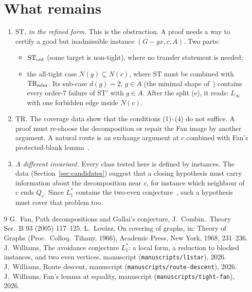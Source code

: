 \documentclass[11pt]{amsart}
\theoremstyle{definition}
\newcommand{\TR}{\mathrm{TR}}
\newcommand{\ST}{\mathrm{ST}}
\begin{document}
\section{What remains}\label{sec:open}
\begin{enumerate}
\item \emph{$\ST$, in the refined form.} This is the obstruction. A proof needs a way to certify a
good but inadmissible instance $(G-gx,c,A)$. Two parts:
  \begin{itemize}
  \item $\ST_{\rm out}$ (some target is non-tight), where no transfer statement is needed;
  \item the all-tight case $N(g)\subseteq N(c)$, where $\ST$ must be combined with $\TR_{\rm adm}$. Its
  sub-case $d(g)=2$, $g\in A$ (the minimal shape of~\cite[Cor.~5.6(5)]{L1S}) contains every
  order-$7$ failure of $\ST'$ with $g\in A$. After the split (e), it reads: $L_\infty$ with one
  forbidden edge inside $N(c)$.
  \end{itemize}
\item \emph{$\TR$.} The coverage data show that the conditions (1)--(4) do not suffice. A proof must
re-choose the decomposition or repair the Fan image by another argument. A natural route is an
exchange argument at $c$ combined with Fan's protected-blank lemma~\cite[Theorem~2.2]{TF}.
\item \emph{A different invariant.} Every class tested here is defined by instances. The data
(Section~\ref{sec:candidates}) suggest that a closing hypothesis must carry information about the
decomposition near $c$, for instance which neighbour of $c$ ends $Q_c$. Since $L_1^*$ contains the
two-even conjecture~\cite[Prop.~3.3]{L1S}, such a hypothesis must cover that problem too.
\end{enumerate}

\begin{thebibliography}{9}
 G.~Fan, Path decompositions and Gallai's conjecture, J.~Combin.\ Theory Ser.~B 93
(2005) 117--125.
 L.~Lov\'asz, On covering of graphs, in: Theory of Graphs (Proc.\ Colloq.\ Tihany,
1966), Academic Press, New York, 1968, 231--236.
 J.~Williams, The avoidance conjecture $L_1^*$: a local form, a reduction to blocked
instances, and two even vertices, manuscript (\texttt{manuscripts/l1star}), 2026.
 J.~Williams, Route descent, manuscript (\texttt{manuscripts/route-descent}), 2026.
 J.~Williams, Fan's lemma at equality, manuscript (\texttt{manuscripts/tight-fan}), 2026.
\end{thebibliography}
\end{document}
